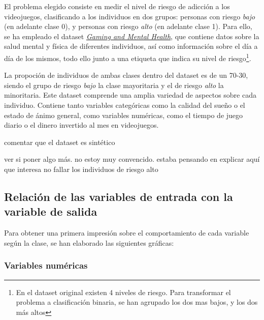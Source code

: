 \documentclass{article}
\begin{document}
El problema elegido consiste en medir el nivel de riesgo de adicción a los videojuegos, clasificando a los individuos en dos grupos: personas con riesgo \textit{bajo} (en adelante clase 0),
y personas con riesgo \textit{alto} (en adelante clase 1). Para ello, se ha empleado el dataset \textit{\href{https://www.kaggle.com/datasets/shaistashahid/gaming-and-mental-health}{Gaming and Mental Health}}, que contiene datos sobre la salud mental y física de diferentes individuos, así como información sobre el día a día de los mismos, todo ello junto a una etiqueta que indica su nivel de riesgo\footnote{En el dataset original existen 4 niveles de riesgo. Para transformar el problema a clasificación binaria, se han agrupado los dos mas bajos, y los dos más altos}.\newline

La propoción de individuos de ambas clases dentro del dataset es de un 70-30, siendo el grupo de riesgo \textit{bajo} la clase mayoritaria y el de riesgo \textit{alto} la minoritaria. Este dataset comprende una amplia variedad de aspectos sobre cada individuo. Contiene tanto variables categóricas como la calidad del sueño o el estado de ánimo general, como variables numéricas, como el tiempo de juego diario o el dinero invertido al mes en videojuegos.\newline

comentar que el dataset es sintético

ver si poner algo más. no estoy muy convencido. estaba pensando en explicar aquí que interesa no fallar los individuos de riesgo alto

\subsection{Relación de las variables de entrada con la variable de salida}

Para obtener una primera impresión sobre el comportamiento de cada variable según la clase, se han elaborado las siguientes gráficas:

\subsubsection{Variables numéricas}
\end{document}
